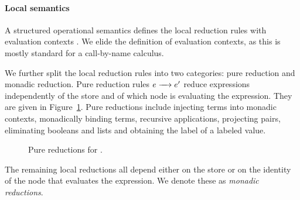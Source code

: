 \paragraph{Local semantics}
A structured operational semantics defines the local reduction rules with evaluation contexts \cite{Felleisen:1988:TPF:73560.73576}. We elide the definition of evaluation contexts, as this is mostly standard for a call-by-name calculus.

We further split the local reduction rules into two categories: pure reduction and monadic reduction. Pure reduction rules $\steppure{\expr}{\expr'}$ reduce expressions independently of the store and of which node is evaluating the expression. They are given in Figure~\ref{fig:pure-reductions}. Pure reductions include injecting terms into monadic contexts, monadically binding terms, recursive applications, projecting pairs, eliminating booleans and lists and obtaining the label of a labeled value.

\begin{figure}
    \centering
    \caption{Pure reductions for \lang.}
    \label{fig:pure-reductions}
\end{figure}

The remaining local reductions all depend either on the store or on the identity of the node that evaluates the expression. We denote these as \emph{monadic reductions}.

